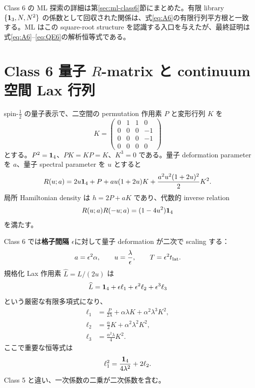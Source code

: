 Class 6 の ML 探索の詳細は第\ref{sec:ml-class6}節にまとめた。有限 library $\{\mathbf 1_{3},N,N^2\}$ の係数として回収された関係は、式\eqref{eq:A6}の有限行列平方根と一致する。ML はこの square-root structure を認識する入口を与えたが、最終証明は式\eqref{eq:A6}--\eqref{eq:QE6}の解析恒等式である。

\section{Class 6 量子 $R$-matrix と continuum 空間 Lax 行列}
spin-$\tfrac12$ の量子表示で、二空間の permutation 作用素 $P$ と変形行列 $K$ を
\begin{equation}
K=\begin{pmatrix}
0&1&1&0\\0&0&0&-1\\0&0&0&-1\\0&0&0&0
\end{pmatrix}
\label{eq:C6K}
\end{equation}
とする。$P^2=\mathbf 1_{4}$、$PK=KP=K$、$K^3=0$ である。量子 deformation parameter を $a$、量子 spectral parameter を $u$ とすると
\begin{equation}
R(u;a)=2u\mathbf 1_{4}+P+au(1+2u)K+
\frac{a^2u^2(1+2u)^2}{2}K^2.
\label{eq:C6R}
\end{equation}
局所 Hamiltonian density は $h=2P+aK$ であり、代数的 inverse relation
\begin{equation}
R(u;a)R(-u;a)=(1-4u^2)\mathbf 1_{4}
\end{equation}
を満たす。

Class 6 では\textbf{格子間隔 $\epsilon$}に対して量子 deformation が二次で scaling する：
\begin{equation}
a=\epsilon^2\alpha,
\qquad u=\frac{\lambda}{\epsilon},
\qquad T=\epsilon^2t_{\rm lat}.
\label{eq:C6scaling}
\end{equation}
規格化 Lax 作用素 $\widehat L=L/(2u)$ は
\begin{equation}
\widehat L=\mathbf 1_{4}+\epsilon\ell_1+\epsilon^2\ell_2+\epsilon^3\ell_3
\label{eq:C6Lseries}
\end{equation}
という厳密な有限多項式になり、
\begin{align}
\ell_1&=\frac{P}{2\lambda}+\alpha\lambda K+\alpha^2\lambda^3K^2,\\
\ell_2&=\frac\alpha2K+\alpha^2\lambda^2K^2,\\
\ell_3&=\frac{\alpha^2\lambda}{4}K^2.
\label{eq:C6ells}
\end{align}
ここで重要な恒等式は
\begin{equation}
\ell_1^2=\frac{\mathbf 1_{4}}{4\lambda^2}+2\ell_2.
\label{eq:C6l1sq}
\end{equation}
Class 5 と違い、一次係数の二乗が二次係数を含む。

